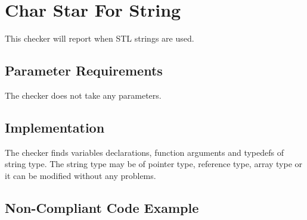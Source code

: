 %
%

\section{Char Star For String}
\label{CharStarForString::overview}

This checker will report when STL strings are used. 



\subsection{Parameter Requirements}
The checker does not take any parameters.

\subsection{Implementation}
The checker finds variables declarations, function arguments and typedefs
of string type. The string type may be of pointer type, reference type,
array type or it can be modified without any problems.

\subsection{Non-Compliant Code Example}

